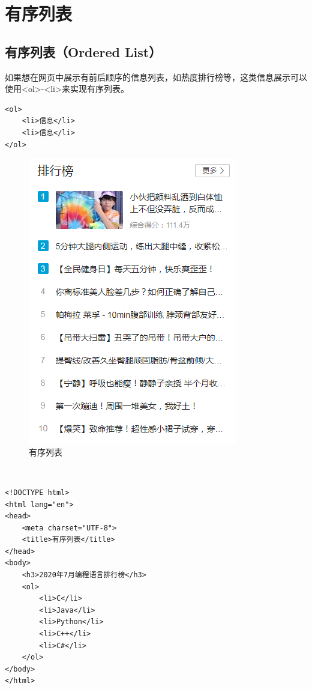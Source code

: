 \section{有序列表}

\subsection{有序列表（Ordered List）}

如果想在网页中展示有前后顺序的信息列表，如热度排行榜等，这类信息展示可以使用<ol>-<li>来实现有序列表。 \\

\begin{lstlisting}[style=htmlcssjs]
<ol>
    <li>信息</li>
    <li>信息</li>
</ol>
\end{lstlisting}

\begin{figure}[H]
	\centering
	\includegraphics[scale=0.7]{img/C3/3-1/1.png}
	\caption{有序列表}
\end{figure}

 \\
\begin{lstlisting}[style=htmlcssjs]
<!DOCTYPE html>
<html lang="en">
<head>
    <meta charset="UTF-8">
    <title>有序列表</title>
</head>
<body>
    <h3>2020年7月编程语言排行榜</h3>
    <ol>
        <li>C</li>
        <li>Java</li>
        <li>Python</li>
        <li>C++</li>
        <li>C#</li>
    </ol>
</body>
</html>
\end{lstlisting}

